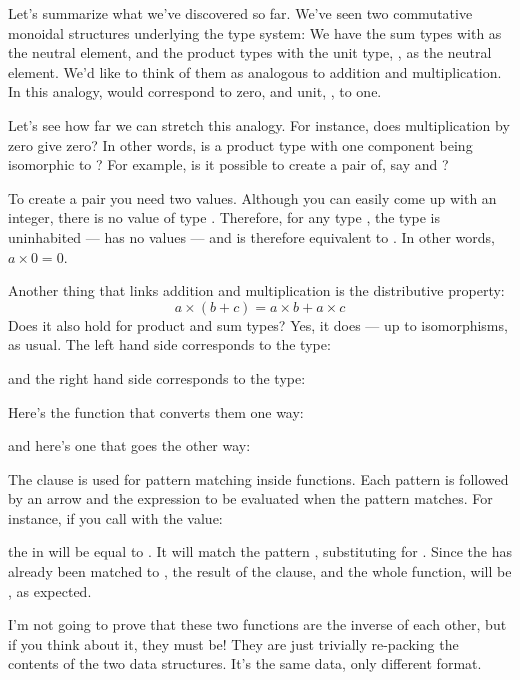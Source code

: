 Let's summarize what we've discovered so far. We've seen two commutative
monoidal structures underlying the type system: We have the sum types
with  as the neutral element, and the product types with
the unit type, \code{()}, as the neutral element. We'd like to think
of them as analogous to addition and multiplication. In this analogy,
 would correspond to zero, and unit, \code{()}, to one.

Let's see how far we can stretch this analogy. For instance, does
multiplication by zero give zero? In other words, is a product type with
one component being  isomorphic to ? For
example, is it possible to create a pair of, say  and
?

To create a pair you need two values. Although you can easily come up
with an integer, there is no value of type . Therefore, for
any type , the type  is uninhabited --- has
no values --- and is therefore equivalent to . In other
words, $a \times 0 = 0$.

Another thing that links addition and multiplication is the distributive
property:
\[a \times (b + c) = a \times b + a \times c\]
Does it also hold for product and sum types? Yes, it does --- up to
isomorphisms, as usual. The left hand side corresponds to the type:

and the right hand side corresponds to the type:

Here's the function that converts them one way:

and here's one that goes the other way:

The  clause is used for pattern matching inside
functions. Each pattern is followed by an arrow and the expression to be
evaluated when the pattern matches. For instance, if you call
 with the value:

the  in  will be equal to
. It will match the pattern ,
substituting  for . Since the  has
already been matched to , the result of the 
clause, and the whole function, will be , as
expected.

I'm not going to prove that these two functions are the inverse of each
other, but if you think about it, they must be! They are just trivially
re-packing the contents of the two data structures. It's the same data,
only different format.

